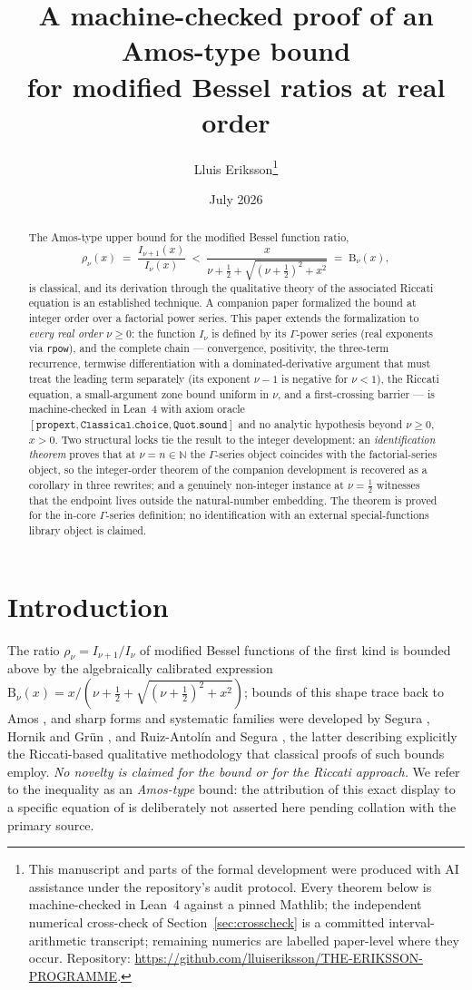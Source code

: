 \documentclass[11pt]{article}
\title{A machine-checked proof of an Amos-type bound\\
for modified Bessel ratios at real order}
\author{Lluis Eriksson\thanks{This manuscript and parts of the formal
development were produced with AI assistance under the repository's
audit protocol.  Every theorem below is machine-checked in Lean~4
against a pinned Mathlib; the independent numerical cross-check of
Section~\ref{sec:crosscheck} is a committed interval-arithmetic
transcript; remaining numerics are labelled paper-level where they
occur.  Repository:
\url{https://github.com/lluiseriksson/THE-ERIKSSON-PROGRAMME}.}}
\date{July 2026}
\newcommand{\lean}[1]{\texttt{#1}}
\newcommand{\RHS}{\mathrm{B}}
\begin{document}
\maketitle

\begin{abstract}
The Amos-type upper bound for the modified Bessel function ratio,
\[
\rho_\nu(x) \;=\; \frac{I_{\nu+1}(x)}{I_\nu(x)}
\;<\;
\frac{x}{\nu+\tfrac12+\sqrt{(\nu+\tfrac12)^2+x^2}} \;=\; \RHS_\nu(x),
\]
is classical, and its derivation through the qualitative theory of
the associated Riccati equation is an established technique.  A
companion paper formalized the bound at integer order over a
factorial power series.  This paper extends the formalization to
\emph{every real order $\nu \ge 0$}: the function $I_\nu$ is defined
by its $\Gamma$-power series (real exponents via \lean{rpow}), and
the complete chain --- convergence, positivity, the three-term
recurrence, termwise differentiation with a dominated-derivative
argument that must treat the leading term separately (its exponent
$\nu-1$ is negative for $\nu < 1$), the Riccati equation, a
small-argument zone bound uniform in $\nu$, and a first-crossing
barrier --- is machine-checked in Lean~4 with axiom oracle
$[\lean{propext}, \lean{Classical.choice}, \lean{Quot.sound}]$ and
no analytic hypothesis beyond $\nu \ge 0$, $x > 0$.  Two structural
locks tie the result to the integer development: an
\emph{identification theorem} proves that at $\nu = n \in \mathbb{N}$
the $\Gamma$-series object coincides with the factorial-series
object, so the integer-order theorem of the companion development is
recovered as a corollary in three rewrites; and a genuinely
non-integer instance at $\nu = \tfrac12$ witnesses that the endpoint
lives outside the natural-number embedding.  The theorem is proved
for the in-core $\Gamma$-series definition; no identification with
an external special-functions library object is claimed.
\end{abstract}

\section{Introduction}

The ratio $\rho_\nu = I_{\nu+1}/I_\nu$ of modified Bessel functions
of the first kind is bounded above by the algebraically calibrated
expression $\RHS_\nu(x) = x/(\nu+\tfrac12+\sqrt{(\nu+\tfrac12)^2+x^2})$;
bounds of this shape trace back to Amos \cite{Amos74}, and sharp
forms and systematic families were developed by Segura
\cite{Segura11}, Hornik and Gr\"un \cite{HG13,HG24}, and
Ruiz-Antol\'in and Segura \cite{RS16}, the latter describing
explicitly the Riccati-based qualitative methodology that classical
proofs of such bounds employ.  \emph{No novelty is claimed for the
bound or for the Riccati approach.}  We refer to the inequality as
an \emph{Amos-type} bound: the attribution of this exact display to
a specific equation of \cite{Amos74} is deliberately not asserted
here pending collation with the primary source.
\end{document}
